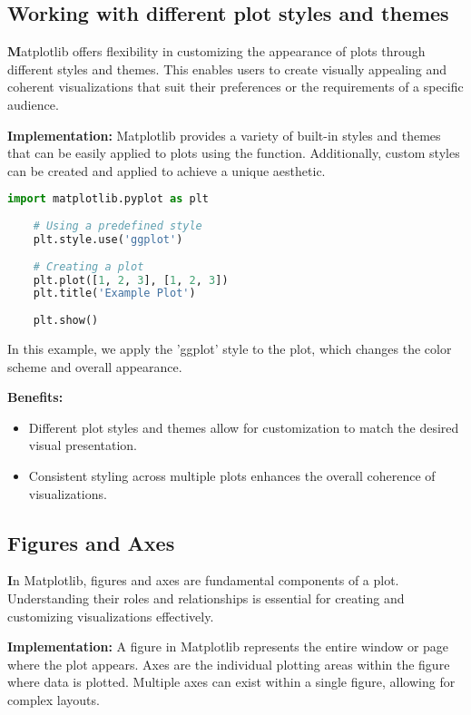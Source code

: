 \subsection*{Working with different plot styles and themes}

\textbf Matplotlib offers flexibility in customizing the appearance of plots through different styles and themes. This enables users to create visually appealing and coherent visualizations that suit their preferences or the requirements of a specific audience.

\textbf{Implementation:} Matplotlib provides a variety of built-in styles and themes that can be easily applied to plots using the  function. Additionally, custom styles can be created and applied to achieve a unique aesthetic.

\begin{lstlisting}[language=Python]
	import matplotlib.pyplot as plt
	
	# Using a predefined style
	plt.style.use('ggplot')
	
	# Creating a plot
	plt.plot([1, 2, 3], [1, 2, 3])
	plt.title('Example Plot')
	
	plt.show()
\end{lstlisting}

In this example, we apply the 'ggplot' style to the plot, which changes the color scheme and overall appearance.

\textbf{Benefits:}
\begin{itemize}
	\item Different plot styles and themes allow for customization to match the desired visual presentation.
	\item Consistent styling across multiple plots enhances the overall coherence of visualizations.
\end{itemize}

\subsection{Figures and Axes}

\textbf In Matplotlib, figures and axes are fundamental components of a plot. Understanding their roles and relationships is essential for creating and customizing visualizations effectively.

\textbf{Implementation:} A figure in Matplotlib represents the entire window or page where the plot appears. Axes are the individual plotting areas within the figure where data is plotted. Multiple axes can exist within a single figure, allowing for complex layouts. \cite{Scipymatplotlib:2024}

